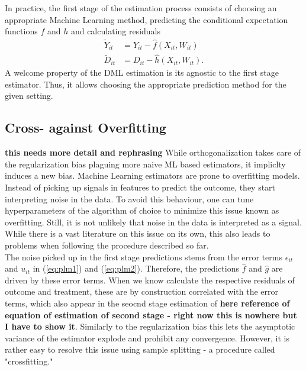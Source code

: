 In practice, the first stage of the estimation process consists of choosing an appropriate Machine Learning method, predicting the conditional expectation functions $f$ and $h$ and calculating residuals 
\begin{align*} 
    \tilde{Y}_{it}&=Y_{it}-\hat{f}(X_{it}, W_{it}) \\ 
    \tilde{D}_{it}&=D_{it}-\hat{h}(X_{it}, W_{it}).
\end{align*}
A welcome property of the DML estimation is its agnostic to the first stage estimator. Thus, it allows choosing the appropriate prediction method for the given setting. 

\subsection{Cross- against Overfitting} \label{sec:cross-fitting}
\textbf{this needs more detail and rephrasing}
While orthogonalization takes care of the regularization bias plaguing more naive ML based estimators, it impliclty induces a new bias. Machine Learning estimators are prone to overfitting models. Instead of picking up signals in features to predict the outcome, they start interpreting noise in the data. To avoid this behaviour, one can tune hyperparameters of the algorithm of choice to minimize this issue known as overfitting. Still, it is not unlikely that noise in the data is interpreted as a signal. While there is a vast literature on this issue on its own, this also leads to problems when following the procedure described so far. \\
The noise picked up in the first stage predictions stems from the error terms $\epsilon_{it}$ and $u_{it}$ in (\ref{eq:plm1}) and (\ref{eq:plm2}). Therefore, the predictions $\hat{f}$ and $\hat{g}$ are driven by these error terms. When we know calculate the respective residuals of outcome and treatment, these are by construction correlated with the error terms, which also appear in the seocnd stage estimation of \textbf{here reference of equation of estimation of second stage - right now this is nowhere but I have to show it}. Similarly to the regularization bias this lets the asymptotic variance of the estimator explode and prohibit any convergence. However, it is rather easy to resolve this issue using sample splitting - a procedure called "crossfitting." \\ 

